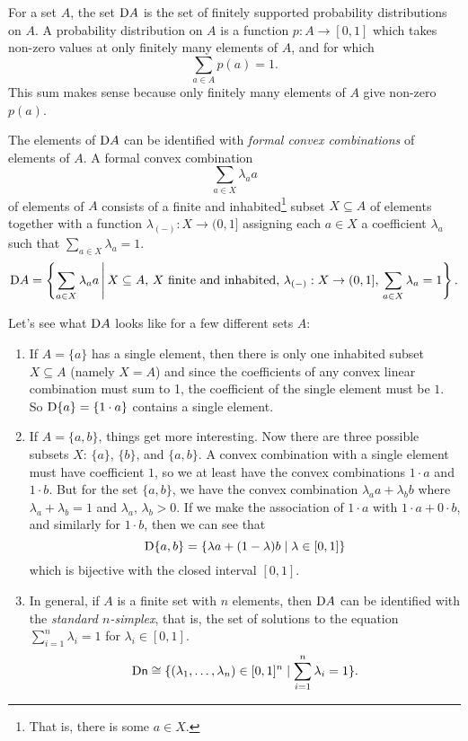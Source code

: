 \documentclass[DynamicalBook]{subfiles}
\begin{document}
\begin{definition}\label{def.set_of_probs}
  For a set $A$, the set $\mathrm{D} A$ is the set of finitely supported
  probability distributions on $A$. A probability distribution on $A$ is a
  function $p : A \to [0, 1]$ which takes non-zero values at only finitely many
  elements of $A$, and for which
  $$\sum_{a \in A} p(a) = 1.$$
This sum makes sense because only finitely many elements of $A$ give non-zero $p(a)$.
  
  The elements of $\mathrm{D} A$ can be identified with  
  \emph{formal convex combinations} of elements of $A$. A formal convex
  combination
$$\sum_{a \in X} \lambda_a a$$
  of elements of $A$ consists of a finite and inhabited\footnote{That is, there
    is some $a \in X$.} subset $X \subseteq A$ of
  elements together with a function $\lambda_{(-)} : X \to (0,1]$ assigning each
  $a \in X$ a coefficient $\lambda_a$ such that $\sum_{a \in X} \lambda_a = 1$.
  \[
\mathrm{D} A = \left\{ \sum_{a \in X} \lambda_a a \,\middle|\, X \subseteq A,\,\mbox{$X$
  finite and inhabited},\, \lambda_{(-)} : X \to (0, 1],\, \sum_{a \in X} \lambda_a = 1\right\}.
  \]
\end{definition}

\begin{example}
  Let's see what $\mathrm{D} A$ looks like for a few different sets $A$:
  \begin{enumerate}
    \item If $A = \{a\}$ has a single element, then there is only one inhabited
      subset $X \subseteq A$ (namely $X = A$) and since the coefficients of any
      convex linear combination must sum to 1, the coefficient of the single
      element must be $1$. So $\mathrm{D} \{a\} = \{1 \cdot a\}$ contains a single element.
    \item If $A = \{a, b\}$, things get more interesting. Now there are three
      possible subsets $X$: $\{a\}$, $\{b\}$, and $\{a, b\}$. A convex
      combination with a single element must have coefficient $1$, so we at
      least have the convex combinations $1 \cdot a$ and $1 \cdot b$. But for
      the set $\{a, b\}$, we have the convex combination
      $\lambda_a a + \lambda_b b$ where $\lambda_a + \lambda_b = 1$ and
      $\lambda_a,\, \lambda_b > 0$. If we make the association of $1 \cdot a$
      with $1\cdot a + 0 \cdot b$, and similarly for $1 \cdot b$, then we can
      see that
      \[
\mathrm{D} \{a, b\} = \{\lambda a + (1 - \lambda) b \mid \lambda \in [0, 1]\}
      \]
      which is bijective with the closed interval $[0, 1]$.
    \item In general, if $A$ is a finite set with $n$ elements, then $\mathrm{D}
      A$ can be identified with the \emph{standard $n$-simplex}, that is, the
      set of solutions to the equation
      $\sum_{i = 1}^n \lambda_i = 1$
      for $\lambda_i \in [0,1]$.
      \[
\mathrm{D} \mathsf{n} \cong \{(\lambda_1, \ldots, \lambda_n) \in [0,1]^n \mid \sum_{i
= 1}^n \lambda_i = 1\}.
      \]
  \end{enumerate}
\end{example}
\end{document}
